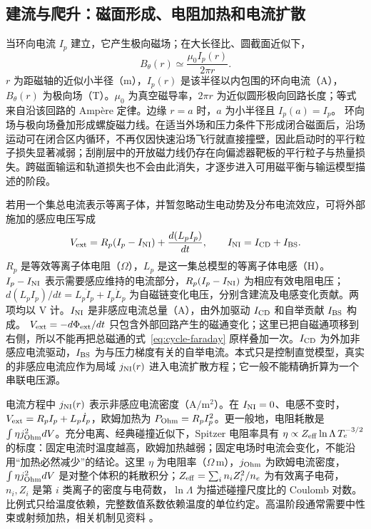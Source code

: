 \documentclass[12pt,fontset=none]{ctexart}
\numberwithin{equation}{section}
\numberwithin{table}{section}
\numberwithin{figure}{section}
\begin{document}
\subsection{建流与爬升：磁面形成、电阻加热和电流扩散}\label{sec:cycle-ramp}

当环向电流 $I_p$ 建立，它产生极向磁场；在大长径比、圆截面近似下，
\begin{equation}\label{eq:cycle-btheta}
 B_\theta(r)\simeq\frac{\mu_0I_p(r)}{2\pi r}.
\end{equation}
$r$ 为距磁轴的近似小半径（m），$I_p(r)$ 是该半径以内包围的环向电流（A），$B_\theta(r)$ 为极向场（T）。$\mu_0$ 为真空磁导率，$2\pi r$ 为近似圆形极向回路长度；等式来自沿该回路的 Ampère 定律。边缘 $r=a$ 时，$a$ 为小半径且 $I_p(a)=I_p$。
环向场与极向场叠加形成螺旋磁力线。在适当外场和压力条件下形成闭合磁面后，沿场运动可在闭合区内循环，不再仅因快速沿场飞行就直接撞壁，因此启动时的平行粒子损失显著减弱；刮削层中的开放磁力线仍存在向偏滤器靶板的平行粒子与热量损失。跨磁面输运和轨道损失也不会由此消失，才逐步进入可用磁平衡与输运模型描述的阶段。

若用一个集总电流表示等离子体，并暂忽略动生电动势及分布电流效应，可将外部施加的感应电压写成
\begin{equation}\label{eq:cycle-ip}
 V_{\rm ext}=R_p(I_p-I_{\rm NI})+\frac{d(L_pI_p)}{dt},
 \qquad I_{\rm NI}=I_{\rm CD}+I_{\rm BS}.
\end{equation}
$R_p$ 是等效等离子体电阻（$\Omega$），$L_p$ 是这一集总模型的等离子体电感（H）。$I_p-I_{\rm NI}$ 表示需要感应维持的电流部分，$R_p(I_p-I_{\rm NI})$ 为相应有效电阻电压；$d(L_pI_p)/dt=L_p\dot I_p+I_p\dot L_p$ 为自磁链变化电压，分别含建流及电感变化贡献。两项均以 V 计。$I_{\rm NI}$ 是非感应电流总量（A），由外加驱动 $I_{\rm CD}$ 和自举贡献 $I_{\rm BS}$ 构成。
$V_{\rm ext}=-d\Phi_{\rm ext}/dt$ 只包含外部回路产生的磁通变化；这里已把自磁通项移到右侧，所以不能再把总磁通的式~\eqref{eq:cycle-faraday} 原样叠加一次。$I_{\rm CD}$ 为外加非感应电流驱动，$I_{\rm BS}$ 为与压力梯度有关的自举电流。本式只是控制直觉模型，真实的非感应电流应作为局域 $j_{\rm NI}(r)$ 进入电流扩散方程；它一般不能精确折算为一个串联电压源。

电流方程中 $j_{\rm NI}(r)$ 表示非感应电流密度（$\mathrm{A/m^2}$）。在 $I_{\rm NI}=0$、电感不变时，$V_{\rm ext}=R_pI_p+L_p\dot I_p$，欧姆加热为 $P_{\rm Ohm}=R_pI_p^2$。更一般地，电阻耗散是 $\int\eta j_{\rm Ohm}^2dV$。充分电离、经典碰撞近似下，Spitzer 电阻率具有 $\eta\propto Z_{\rm eff}\ln\Lambda\,T_e^{-3/2}$ 的标度：固定电流时温度越高，欧姆加热越弱；固定电场时电流会变化，不能沿用``加热必然减少''的结论。这里 $\eta$ 为电阻率（$\Omega\,\mathrm m$），$j_{\rm Ohm}$ 为欧姆电流密度，$\int\eta j_{\rm Ohm}^2dV$ 是对整个体积的耗散积分；$Z_{\rm eff}=\sum_i n_iZ_i^2/n_e$ 为有效离子电荷，$n_i,Z_i$ 是第 $i$ 类离子的密度与电荷数，$\ln\Lambda$ 为描述碰撞尺度比的 Coulomb 对数。比例式只给温度依赖，完整数值系数依赖温度的单位约定。高温阶段通常需要中性束或射频加热，相关机制见资料 \cite{C5}。
\end{document}
